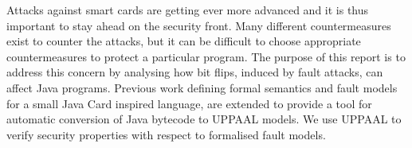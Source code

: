 Attacks against smart cards are getting ever more advanced and it is thus important to stay ahead on the security front. 
Many different countermeasures exist to counter the attacks, but it can be difficult to choose appropriate countermeasures to protect a particular program. 
The purpose of this report is to address this concern by analysing how bit flips, induced by fault attacks, can affect Java programs. Previous work defining formal semantics and fault models for a small Java Card inspired language, are extended to provide a tool for automatic conversion of Java bytecode to UPPAAL models. We use UPPAAL to verify security properties with respect to formalised fault models.


